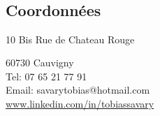 \documentclass[9pt, oneside, a4paper, titlepage]{extarticle}
\begin{document}
    \begin{tcolorbox}
        \vspace*{0.2cm}
        \hspace*{0.7mm}
        \begin{minipage}[t]{6.2cm}
            \begin{spacing}{0.95}
            \vspace*{-0.5cm}
            \begin{tcolorbox}[grow to left by = 0.6cm, colback = gray!25, colframe = white]
                
                \section*{\\Coordonnées}
                \hspace*{0.4cm}
                10 Bis Rue de Chateau Rouge

                \hspace*{0.4cm}
                \vspace*{0.2cm}
                60730 Cauvigny\\
                \hspace*{0.4cm}
                Tel: 07 65 21 77 91\\
                \hspace*{0.4cm}
                Email: savarytobias@hotmail.com\\
                \hspace*{0.4cm}
                \href{www.linkedin.com/in/tobiassavary}{www.linkedin.com/in/tobiassavary}
                \vspace*{0.2cm}


\end{tcolorbox}
\end{spacing}
\end{minipage}
\end{tcolorbox}
\end{document}
